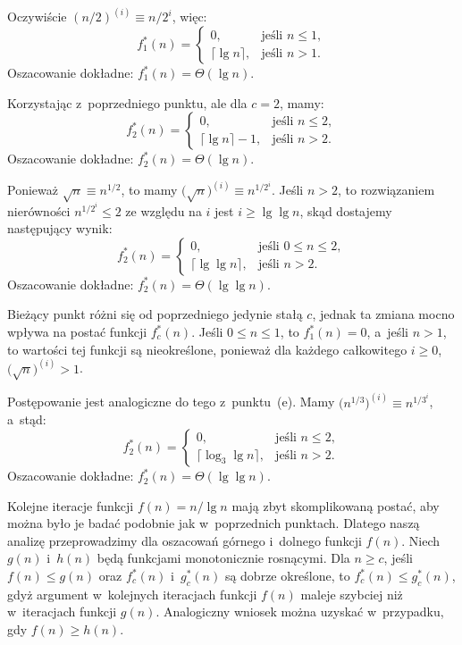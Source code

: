 \subproblem %
Oczywiście $(n/2)^{(i)}\equiv n/2^i$, więc:
\[
	f_1^*(n) =
	\begin{cases}
		0, & \text{jeśli $n\le1$}, \\
		\lceil\lg n\rceil, & \text{jeśli $n>1$}.
	\end{cases}
\]
Oszacowanie dokładne: $f_1^*(n)=\Theta(\lg n)$.

\subproblem %
Korzystając z~poprzedniego punktu, ale dla $c=2$, mamy:
\[
	f_2^*(n) =
	\begin{cases}
		0, & \text{jeśli $n\le2$}, \\
		\lceil\lg n\rceil-1, & \text{jeśli $n>2$}.
	\end{cases}
\]
Oszacowanie dokładne: $f_2^*(n)=\Theta(\lg n)$.

\subproblem %
Ponieważ $\sqrt{n}\equiv n^{1/2}$, to mamy $\bigl(\!\sqrt{n}\bigr)^{(i)}\equiv n^{1/2^i}$\!. Jeśli $n>2$, to rozwiązaniem nierówności $n^{1/2^i}\le2$ ze względu na $i$ jest $i\ge\lg\lg n$, skąd dostajemy następujący wynik:
\[
	f_2^*(n) =
	\begin{cases}
		0, & \text{jeśli $0\le n\le2$}, \\
		\lceil\lg\lg n\rceil, & \text{jeśli $n>2$}.
	\end{cases}
\]
Oszacowanie dokładne: $f_2^*(n)=\Theta(\lg\lg n)$.

\subproblem %
Bieżący punkt różni się od poprzedniego jedynie stałą $c$, jednak ta zmiana mocno wpływa na postać funkcji $f_c^*(n)$. Jeśli $0\le n\le1$, to $f_1^*(n)=0$, a~jeśli $n>1$, to wartości tej funkcji są nieokreślone, ponieważ dla każdego całkowitego $i\ge0$, $\bigl(\!\sqrt{n}\bigr)^{(i)}>1$.

\subproblem %
Postępowanie jest analogiczne do tego z~punktu~(e). Mamy $\bigl(n^{1/3}\bigr)^{(i)}\equiv n^{1/3^i}$, a~stąd:
\[
	f_2^*(n) =
	\begin{cases}
		0, & \text{jeśli $n\le2$}, \\
		\lceil\log_3\lg n\rceil, & \text{jeśli $n>2$}.
	\end{cases}
\]
Oszacowanie dokładne: $f_2^*(n)=\Theta(\lg\lg n)$.

\subproblem %
Kolejne iteracje funkcji $f(n)=n/\!\lg n$ mają zbyt skomplikowaną postać, aby można było je badać podobnie jak w~poprzednich punktach. Dlatego naszą analizę przeprowadzimy dla oszacowań górnego i~dolnego funkcji $f(n)$. Niech $g(n)$ i~$h(n)$ będą funkcjami monotonicznie rosnącymi. Dla $n\ge c$, jeśli $f(n)\le g(n)$ oraz $f_c^*(n)$ i~$g_c^*(n)$ są dobrze określone, to $f_c^*(n)\le g_c^*(n)$, gdyż argument w~kolejnych iteracjach funkcji $f(n)$ maleje szybciej niż w~iteracjach funkcji $g(n)$. Analogiczny wniosek można uzyskać w~przypadku, gdy $f(n)\ge h(n)$.

